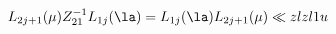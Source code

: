 \begin{equation}
L_{2 j+1}(\mu) Z_{21}^{-1}L_{1 j}(\la) = L_{1 j}(\la)
 L_{2 j+1}(\mu)
 \ll{zlzl1u}\end{equation}

